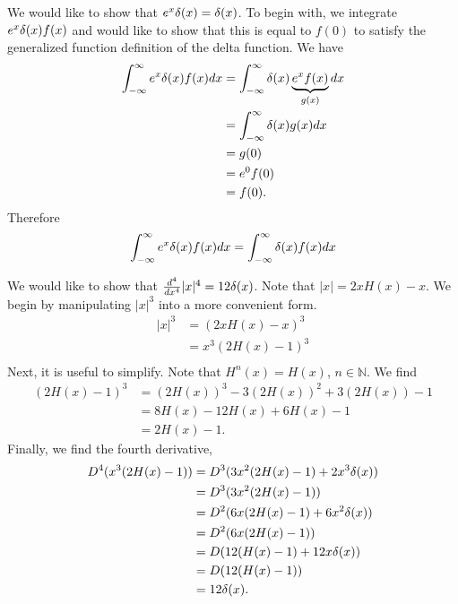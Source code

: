 \begin{example}
    We would like to show that \(e^x\delta(x)=\delta(x)\). To begin with, we integrate \(e^x\delta(x)f(x)\) and would like to show that this is equal to \(f(0)\) to satisfy the generalized function definition of the delta function. We have
    \begin{equation}
        \begin{split}
            \int_{-\infty}^{\infty} e^x\delta(x)f(x)dx &= \int_{-\infty}^{\infty} \delta(x)\underbrace{e^xf(x)}_{g(x)}dx\\
            &=\int_{-\infty}^{\infty} \delta(x)g(x)dx\\
            &=g(0)\\
            &=e^0f(0)\\
            &=f(0).\\
        \end{split}
    \end{equation}
    Therefore
    \begin{equation}
        \int_{-\infty}^{\infty} e^x\delta(x)f(x)dx = \int_{-\infty}^{\infty} \delta(x)f(x)dx
    \end{equation}
\end{example}
\begin{example}
    We would like to show that \(\frac{d^4}{dx^4}|x|^4 = 12\delta(x)\). Note that \(|x|=2xH(x)-x\). We begin by manipulating \(|x|^3\) into a more convenient form.
    \begin{equation}
        \begin{split}
            |x|^3 &= (2xH(x)-x)^3\\
            &=x^3(2H(x)-1)^3\\
        \end{split}
    \end{equation}
    Next, it is useful to simplify. Note that \(H^n(x)=H(x)\), \(n\in\mathbb{N}\). We find
    \begin{equation}
        \begin{split}
            (2H(x)-1)^3 &= (2H(x))^3-3(2H(x))^2+3(2H(x))-1\\
            &=8H(x)-12H(x)+6H(x)-1\\
            &=2H(x)-1.
        \end{split}
    \end{equation}
    Finally, we find the fourth derivative,
    \begin{equation}
        \begin{split}
            D^4(x^3(2H(x)-1)) &= D^3(3x^2(2H(x)-1) +2x^3\delta(x))\\
            &=D^3(3x^2(2H(x)-1))\\
            &= D^2(6x(2H(x)-1) + 6x^2\delta(x))\\
            &=D^2(6x(2H(x)-1))\\
            &= D(12(H(x)-1) + 12x\delta(x))\\
            &= D(12(H(x)-1))\\
            &= 12\delta(x).
        \end{split}
    \end{equation}
\end{example}